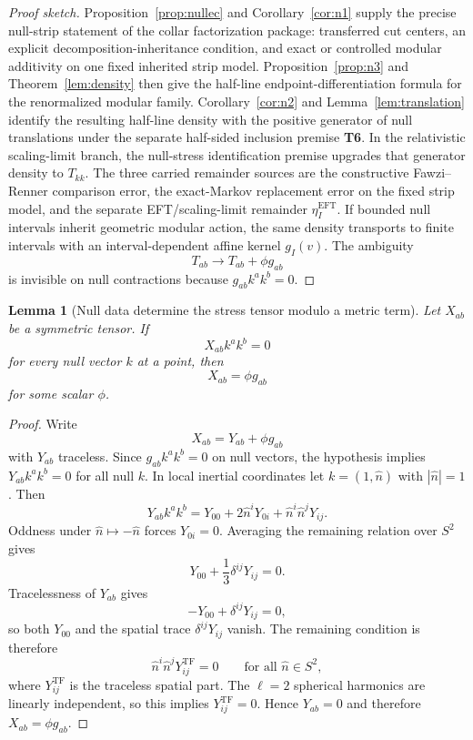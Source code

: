 \documentclass[11pt]{article}
\newtheorem{lemma}[theorem]{Lemma}
\begin{document}
\begin{proof}[Proof sketch]
Proposition~\ref{prop:nullec} and Corollary~\ref{cor:n1} supply the precise null-strip statement of the collar factorization package: transferred cut centers, an explicit decomposition-inheritance condition, and exact or controlled modular additivity on one fixed inherited strip model. Proposition~\ref{prop:n3} and Theorem~\ref{lem:density} then give the half-line endpoint-differentiation formula for the renormalized modular family. Corollary~\ref{cor:n2} and Lemma~\ref{lem:translation} identify the resulting half-line density with the positive generator of null translations under the separate half-sided inclusion premise \textbf{T6}. In the relativistic scaling-limit branch, the null-stress identification premise upgrades that generator density to \(T_{kk}\). The three carried remainder sources are the constructive Fawzi--Renner comparison error, the exact-Markov replacement error on the fixed strip model, and the separate EFT/scaling-limit remainder \(\eta_I^{\mathrm{EFT}}\). If bounded null intervals inherit geometric modular action, the same density transports to finite intervals with an interval-dependent affine kernel \(g_I(v)\). The ambiguity
\[
T_{ab}\to T_{ab}+\phi g_{ab}
\]
is invisible on null contractions because \(g_{ab}k^ak^b=0\).
\end{proof}

\begin{lemma}[Null data determine the stress tensor modulo a metric term]\label{lem:nullreconstruct}
Let \(X_{ab}\) be a symmetric tensor. If
\[
X_{ab}k^ak^b=0
\]
for every null vector \(k\) at a point, then
\[
X_{ab}=\phi g_{ab}
\]
for some scalar \(\phi\).
\end{lemma}

\begin{proof}
Write
\[
X_{ab}=Y_{ab}+\phi g_{ab}
\]
with \(Y_{ab}\) traceless. Since \(g_{ab}k^ak^b=0\) on null vectors, the hypothesis implies \(Y_{ab}k^ak^b=0\) for all null \(k\). In local inertial coordinates let \(k=(1,\hat n)\) with \(|\hat n|=1\). Then
\[
Y_{ab}k^ak^b
=
Y_{00}+2\hat n^iY_{0i}+\hat n^i\hat n^jY_{ij}.
\]
Oddness under \(\hat n\mapsto-\hat n\) forces \(Y_{0i}=0\). Averaging the remaining relation over \(S^2\) gives
\[
Y_{00}+\frac13\delta^{ij}Y_{ij}=0.
\]
Tracelessness of \(Y_{ab}\) gives
\[
-Y_{00}+\delta^{ij}Y_{ij}=0,
\]
so both \(Y_{00}\) and the spatial trace \(\delta^{ij}Y_{ij}\) vanish. The remaining condition is therefore
\[
\hat n^i\hat n^j Y_{ij}^{\mathrm{TF}}=0
\qquad
\text{for all }\hat n\in S^2,
\]
where \(Y_{ij}^{\mathrm{TF}}\) is the traceless spatial part. The \(\ell=2\) spherical harmonics are linearly independent, so this implies \(Y_{ij}^{\mathrm{TF}}=0\). Hence \(Y_{ab}=0\) and therefore \(X_{ab}=\phi g_{ab}\).
\end{proof}
\end{document}
